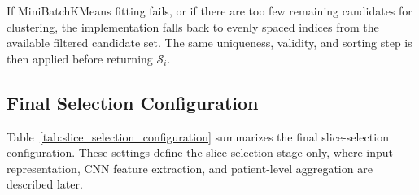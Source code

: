 If MiniBatchKMeans fitting fails, or if there are too few remaining candidates for clustering, the implementation falls back to evenly spaced indices from the available filtered candidate set. The same uniqueness, validity, and sorting step is then applied before returning \(\mathcal{S}_i\).


\subsection{Final Selection Configuration}
\label{sec:final_selection_configuration}

Table~\ref{tab:slice_selection_configuration} summarizes the final slice-selection configuration. These settings define the slice-selection stage only, where input representation, CNN feature extraction, and patient-level aggregation are described later.

